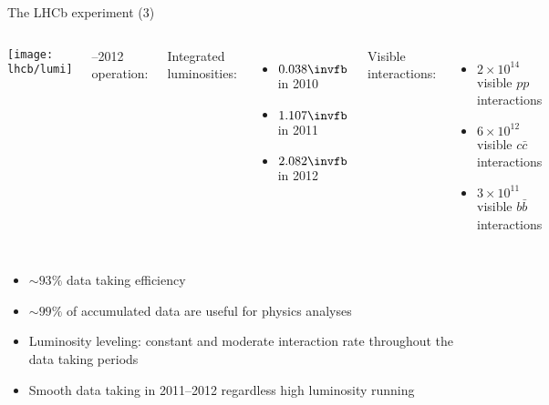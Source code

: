 \begin{frame}[t]{The LHCb experiment (3)}

\begin{columns}[t]

\texttt{[image: lhcb/lumi]}

\begin{minipage}[c][.55\textheight][t]{\linewidth}
--2012 operation:

\bigskip
Integrated luminosities:

\begin{itemize}
\item $0.038\invfb$ in 2010
\item $1.107\invfb$ in 2011
\item $2.082\invfb$ in 2012
\end{itemize}

Visible  interactions:
\begin{itemize}
\item $2\times10^{14}$ visible $pp$ interactions 
\item $6\times10^{12}$ visible $c\bar{c}$ interactions 
\item $3\times10^{11}$ visible $b\bar{b}$ interactions 
\end{itemize}
\end{minipage}
\end{columns}

\begin{itemize}
\item ${\sim}93\%$ data taking efficiency
\item ${\sim}99\%$ of accumulated data are useful for physics analyses
\item Luminosity leveling: constant and moderate interaction rate throughout the data taking periods
\item Smooth data taking in 2011--2012 regardless high luminosity running 
\end{itemize}

\end{frame}